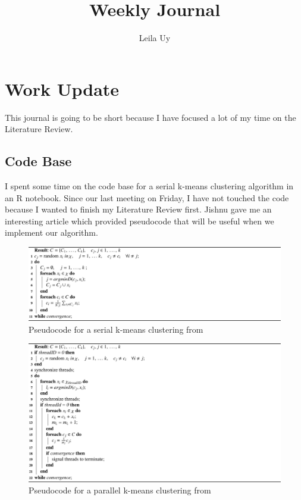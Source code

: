 \documentclass[a4paper,10pt]{article}
\title{Weekly Journal}
\author{Leila Uy}
\begin{document}
\maketitle

\section{Work Update}
This journal is going to be short because I have focused a lot of my time on the Literature Review.

\subsection{Code Base}
I spent some time on the code base for a serial k-means clustering algorithm in an R notebook. Since our last meeting on 
Friday, I have not touched the code because I wanted to finish my Literature Review first. Jishnu gave me an interesting 
article which provided pseudocode that will be useful when we implement our algorithm.

\begin{figure}[h!]
    \caption{Pseudocode for a serial k-means clustering from \cite{cuomo2019a}}
    \centering
    \includegraphics[scale=1.2]{code1.jpg}
\end{figure}

\begin{figure}[h!]
    \caption{Pseudocode for a parallel k-means clustering from \cite{cuomo2019a}}
    \centering
    \includegraphics[scale=1.3]{code2.jpg}
\end{figure}
\end{document}
